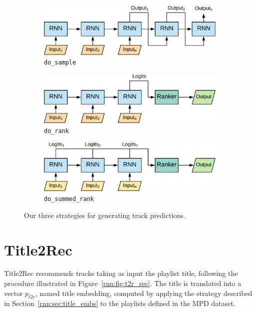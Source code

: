 \begin{figure}
\centering
\begin{subfigure}{.8\textwidth}
\includegraphics[width=\textwidth]{sample}
\caption{\texttt{do\_sample}}
\bigskip
\end{subfigure}
\begin{subfigure}{.8\textwidth}
\includegraphics[width=\textwidth]{rank}
\caption{\texttt{do\_rank}}
\bigskip
\end{subfigure}
\begin{subfigure}{.8\textwidth}
\includegraphics[width=\textwidth]{summed}
\caption{\texttt{do\_summed\_rank}}
\end{subfigure}
\caption[Strategies for generating track predictions]{Our three strategies for generating track predictions.}
\label{rnn:fig:predictions}
\end{figure}

\section{Title2Rec}
\label{rnn:sec:t2r}

Title2Rec recommends tracks taking as input the playlist title, following the procedure illustrated in Figure~\ref{rnn:fig:t2r_rec}. The title is translated into a vector $p_{t2r}$, named title embedding, computed by applying the strategy described in Section~\ref{rnn:sec:title_embs} to the playlists defined in the MPD dataset.

